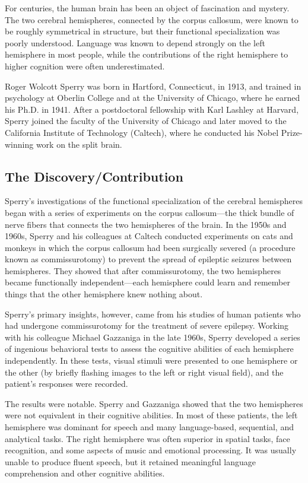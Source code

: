 For centuries, the human brain has been an object of fascination and mystery. The two cerebral hemispheres, connected by the corpus callosum, were known to be roughly symmetrical in structure, but their functional specialization was poorly understood. Language was known to depend strongly on the left hemisphere in most people, while the contributions of the right hemisphere to higher cognition were often underestimated.

Roger Wolcott Sperry was born in Hartford, Connecticut, in 1913, and trained in psychology at Oberlin College and at the University of Chicago, where he earned his Ph.D. in 1941. After a postdoctoral fellowship with Karl Lashley at Harvard, Sperry joined the faculty of the University of Chicago and later moved to the California Institute of Technology (Caltech), where he conducted his Nobel Prize-winning work on the split brain.

\subsection{The Discovery/Contribution}

Sperry's investigations of the functional specialization of the cerebral hemispheres began with a series of experiments on the corpus callosum---the thick bundle of nerve fibers that connects the two hemispheres of the brain. In the 1950s and 1960s, Sperry and his colleagues at Caltech conducted experiments on cats and monkeys in which the corpus callosum had been surgically severed (a procedure known as commissurotomy) to prevent the spread of epileptic seizures between hemispheres. They showed that after commissurotomy, the two hemispheres became functionally independent---each hemisphere could learn and remember things that the other hemisphere knew nothing about.

Sperry's primary insights, however, came from his studies of human patients who had undergone commissurotomy for the treatment of severe epilepsy. Working with his colleague Michael Gazzaniga in the late 1960s, Sperry developed a series of ingenious behavioral tests to assess the cognitive abilities of each hemisphere independently. In these tests, visual stimuli were presented to one hemisphere or the other (by briefly flashing images to the left or right visual field), and the patient's responses were recorded.

The results were notable. Sperry and Gazzaniga showed that the two hemispheres were not equivalent in their cognitive abilities. In most of these patients, the left hemisphere was dominant for speech and many language-based, sequential, and analytical tasks. The right hemisphere was often superior in spatial tasks, face recognition, and some aspects of music and emotional processing. It was usually unable to produce fluent speech, but it retained meaningful language comprehension and other cognitive abilities.

